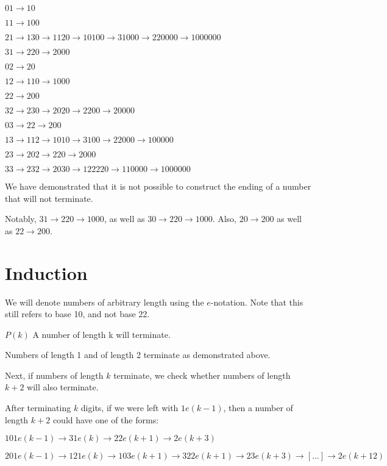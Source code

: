 \documentclass[10pt,a4paper,showpacs,nofootinbib,aps,superscriptaddress,eqsecnum,prd,showkeys,twocolumn,notitlepage]{article}
\begin{document}
$01 \rightarrow 10$

$11 \rightarrow 100$

$21 \rightarrow 130 \rightarrow 1120 \rightarrow 10100 \rightarrow 31000 \rightarrow 220000 \rightarrow 1000000$

$31 \rightarrow 220 \rightarrow 2000$

$02 \rightarrow 20$

$12 \rightarrow 110 \rightarrow 1000$

$22 \rightarrow 200$

$32 \rightarrow 230 \rightarrow 2020 \rightarrow 2200 \rightarrow 20000$

$03 \rightarrow 22 \rightarrow 200$

$13 \rightarrow 112 \rightarrow 1010 \rightarrow 3100 \rightarrow 22000 \rightarrow 100000$

$23 \rightarrow 202 \rightarrow 220 \rightarrow 2000$

$33 \rightarrow 232 \rightarrow 2030 \rightarrow 122220 \rightarrow 110000 \rightarrow 1000000$

We have demonstrated that it is not possible to construct the ending of a number that will not terminate.

Notably, $31 \rightarrow 220 \rightarrow 1000$, as well as $30 \rightarrow 220 \rightarrow 1000$.  Also, $20 \rightarrow 200$ as well as $22 \rightarrow 200$.

\addtocounter{section}{6}

\section{Induction}

We will denote numbers of arbitrary length using the $e$-notation. Note that this still refers to base 10, and not base 22.

$P(k)$ A number of length k will terminate.

Numbers of length 1 and of length 2 terminate as demonstrated above.

Next, if numbers of length $k$ terminate, we check whether numbers of length $k+2$ will also terminate.

After terminating $k$ digits, if we were left with $1e(k-1)$, then a number of length $k+2$ could have one of the forms:

$101e(k-1) \rightarrow 31e(k) \rightarrow 22e(k+1) \rightarrow 2e(k+3)$

$201e(k-1) \rightarrow 121e(k) \rightarrow 103e(k+1) \rightarrow 322e(k+1) \rightarrow 23e(k+3) \rightarrow [...] \rightarrow 2e(k+12)$
\end{document}
